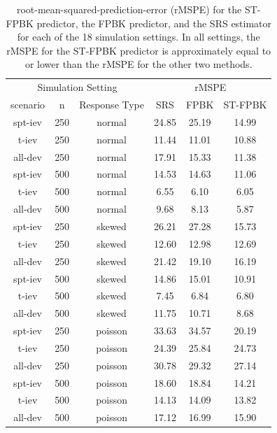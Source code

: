 \documentclass[]{article}    %
\begin{document}
\begin{table}[H]

\caption{\label{tab:simrmspetab}root-mean-squared-prediction-error (rMSPE) for the ST-FPBK predictor, the FPBK predictor, and the SRS estimator for each of the 18 simulation settings. In all settings, the rMSPE for the ST-FPBK predictor is approximately equal to or lower than the rMSPE for the other two methods.}
\centering
\begin{tabular}[t]{cccccc}
\toprule
\multicolumn{3}{c}{Simulation Setting} & \multicolumn{3}{c}{rMSPE} \\
\cmidrule(l{3pt}r{3pt}){1-3} \cmidrule(l{3pt}r{3pt}){4-6}
scenario & n & Response Type & SRS & FPBK & ST-FPBK\\
\midrule
spt-iev & 250 & normal & 24.85 & 25.19 & 14.99\\
t-iev & 250 & normal & 11.44 & 11.01 & 10.88\\
all-dev & 250 & normal & 17.91 & 15.33 & 11.38\\
\midrule
spt-iev & 500 & normal & 14.53 & 14.63 & 11.06\\
t-iev & 500 & normal & 6.55 & 6.10 & 6.05\\
all-dev & 500 & normal & 9.68 & 8.13 & 5.87\\
\midrule
spt-iev & 250 & skewed & 26.21 & 27.28 & 15.73\\
t-iev & 250 & skewed & 12.60 & 12.98 & 12.69\\
all-dev & 250 & skewed & 21.42 & 19.10 & 16.19\\
\midrule
spt-iev & 500 & skewed & 14.86 & 15.01 & 10.91\\
t-iev & 500 & skewed & 7.45 & 6.84 & 6.80\\
all-dev & 500 & skewed & 11.75 & 10.71 & 8.68\\
\midrule
spt-iev & 250 & poisson & 33.63 & 34.57 & 20.19\\
t-iev & 250 & poisson & 24.39 & 25.84 & 24.73\\
all-dev & 250 & poisson & 30.78 & 29.32 & 27.14\\
\midrule
spt-iev & 500 & poisson & 18.60 & 18.84 & 14.21\\
t-iev & 500 & poisson & 14.13 & 14.09 & 13.82\\
all-dev & 500 & poisson & 17.12 & 16.99 & 15.90\\
\bottomrule
\end{tabular}
\end{table}
\end{document}
